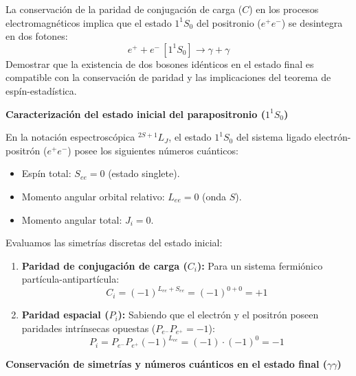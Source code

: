 \newpage
\begin{problema}
La conservación de la paridad de conjugación de carga ($C$) en los procesos electromagnéticos implica que el estado $1^1S_0$ del positronio ($e^+e^-$) se desintegra en dos fotones:
\begin{equation*}
    e^+ + e^- \, [1^1S_0] \longrightarrow \gamma + \gamma
\end{equation*}
Demostrar que la existencia de dos bosones idénticos en el estado final es compatible con la conservación de paridad y las implicaciones del teorema de espín-estadística.

\tcblower
\textbf{Caracterización del estado inicial del parapositronio ($1^1S_0$)}

En la notación espectroscópica $^{2S+1}L_J$, el estado $1^1S_0$ del sistema ligado electrón-positrón ($e^+e^-$) posee los siguientes números cuánticos:
\begin{itemize}
    \item Espín total: $S_{ee} = 0$ (estado singlete).
    \item Momento angular orbital relativo: $L_{ee} = 0$ (onda $S$).
    \item Momento angular total: $J_i = 0$.
\end{itemize}

Evaluamos las simetrías discretas del estado inicial:
\begin{enumerate}[label=\arabic*.]
    \item \textbf{Paridad de conjugación de carga ($C_i$):} Para un sistema fermiónico partícula-antipartícula:
    \begin{equation*}
        C_i = (-1)^{L_{ee} + S_{ee}} = (-1)^{0+0} = +1
    \end{equation*}
    \item \textbf{Paridad espacial ($P_i$):} Sabiendo que el electrón y el positrón poseen paridades intrínsecas opuestas ($P_{e^-} P_{e^+} = -1$):
    \begin{equation*}
        P_i = P_{e^-} P_{e^+} (-1)^{L_{ee}} = (-1) \cdot (-1)^0 = -1
    \end{equation*}
\end{enumerate}

\textbf{Conservación de simetrías y números cuánticos en el estado final ($\gamma\gamma$)}


\end{problema}
